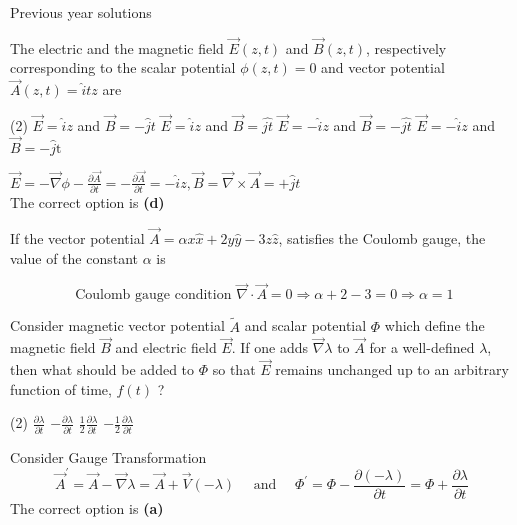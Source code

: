 \newpage
\begin{abox}
	Previous year solutions
	\end{abox}
\begin{enumerate}
	\begin{minipage}{\textwidth}
		\item  The electric and the magnetic field $\vec{E}(z, t)$ and $\vec{B}(z, t)$, respectively corresponding to the scalar potential $\phi(z, t)=0$ and vector potential $\vec{A}(z, t)=\hat{i} t z$ are
	\end{minipage}
	\begin{tasks}(2)
		\task[\textbf{A.}] $\vec{E}=\hat{i} z$ and $\vec{B}=-\hat{j} t$
		\task[\textbf{B.}]$\vec{E}=\hat{i} z$ and $\vec{B}=\hat{j t}$
		\task[\textbf{C.}]$\vec{E}=-\hat{i} z$ and $\vec{B}=-\hat{j t}$
		\task[\textbf{D.}]$\vec{E}=-\hat{i} z$ and $\vec{B}=-\hat{j} \mathrm{t}$
	\end{tasks}
\begin{answer}
	$\vec{E}=-\vec{\nabla} \phi-\frac{\partial \vec{A}}{\partial t}=-\frac{\partial \vec{A}}{\partial t}=-\hat{i} z, \vec{B}=\vec{\nabla} \times \vec{A}=+\hat{j} t$\\
The correct option is \textbf{(d)}
\end{answer}
\begin{minipage}{\textwidth}
	\item If the vector potential $\vec{A}=\alpha x \hat{x}+2 y \hat{y}-3 z \hat{z}$, satisfies the Coulomb gauge, the value of the constant $\alpha$ is
\end{minipage}
\begin{answer}
$$\text { Coulomb gauge condition } \vec{\nabla} \cdot \vec{A}=0 \Rightarrow \alpha+2-3=0 \Rightarrow \alpha=1$$	
\end{answer}
\begin{minipage}{\textwidth}
	\item Consider magnetic vector potential $\tilde{A}$ and scalar potential $\Phi$ which define the magnetic field $\vec{B}$ and electric field $\vec{E}$. If one adds $\vec{\nabla} \lambda$ to $\vec{A}$ for a well-defined $\lambda$, then what should be added to $\Phi$ so that $\vec{E}$ remains unchanged up to an arbitrary function of time, $f(t)$ ?
\end{minipage}
\begin{tasks}(2)
	\task[\textbf{A.}] $\frac{\partial \lambda}{\partial t}$
	\task[\textbf{B.}]$-\frac{\partial \lambda}{\partial t}$
	\task[\textbf{C.}]$\frac{1}{2} \frac{\partial \lambda}{\partial t}$
	\task[\textbf{D.}]$-\frac{1}{2} \frac{\partial \lambda}{\partial t}$
\end{tasks}
\begin{answer}
Consider Gauge Transformation
$$
\vec{A}^{\prime}=\vec{A}-\vec{\nabla} \lambda=\vec{A}+\vec{V}(-\lambda) \quad \text { and } \quad \Phi^{\prime}=\Phi-\frac{\partial(-\lambda)}{\partial t}=\Phi+\frac{\partial \lambda}{\partial t}
$$
The correct option is \textbf{(a)}	
\end{answer}




\end{enumerate}
